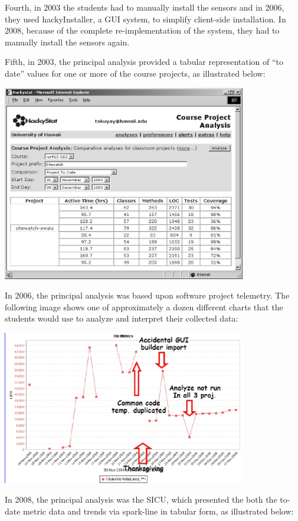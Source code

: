\documentclass[11pt]{article}
\begin{document}
Fourth, in 2003 the students had to manually install the sensors and in 2006, they used hackyInstaller, a GUI system, to simplify client-side installation. In 2008, because of the complete re-implementation of the system, they had to manually install the sensors again.

Fifth, in 2003, the principal analysis provided a tabular representation of ``to date'' values for one or more of the course projects, as illustrated below:

\includegraphics[width=0.8\textwidth]{course-project-analysis-to-date-2003}

In 2006, the principal analysis was based upon software project telemetry. The following image shows one of approximately a dozen different charts that the students would use to analyze and interpret their collected data:

\includegraphics[width=0.8\textwidth]{telemetry-2006}

In 2008, the principal analysis was the SICU, which presented the both the to-date metric data and trends via spark-line in tabular form, as illustrated below:
\end{document}
